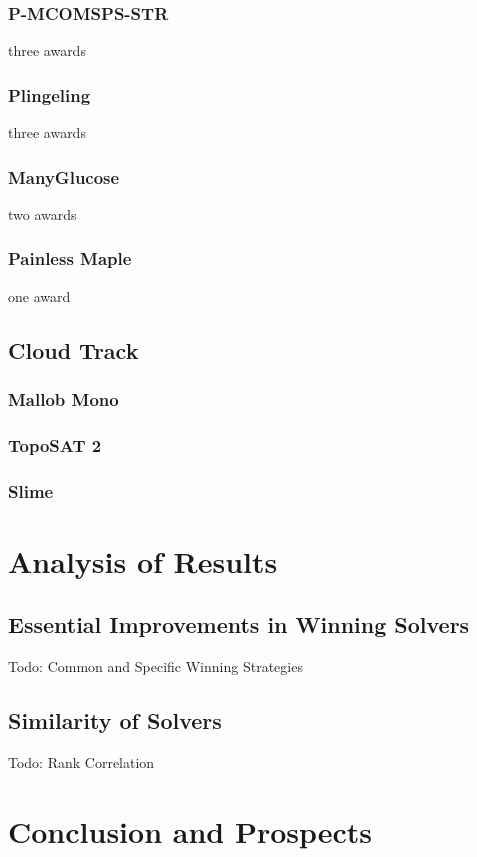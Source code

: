 \documentclass{elsarticle}
\newcommand{\todo}[1]{{\color{purple}Todo: #1}}
\begin{document}
\subsubsection{P-MCOMSPS-STR} three awards

\subsubsection{Plingeling} three awards

\subsubsection{ManyGlucose} two awards

\subsubsection{Painless Maple} one award


\subsection{Cloud Track}

\subsubsection{Mallob Mono}

\subsubsection{TopoSAT 2}

\subsubsection{Slime}


\section{Analysis of Results}
\label{sec:analysis}

\subsection{Essential Improvements in Winning Solvers}

\todo{Common and Specific Winning Strategies}

\subsection{Similarity of Solvers}

\todo{Rank Correlation}


\section{Conclusion and Prospects}
\label{sec:conclusion}





\end{document}
